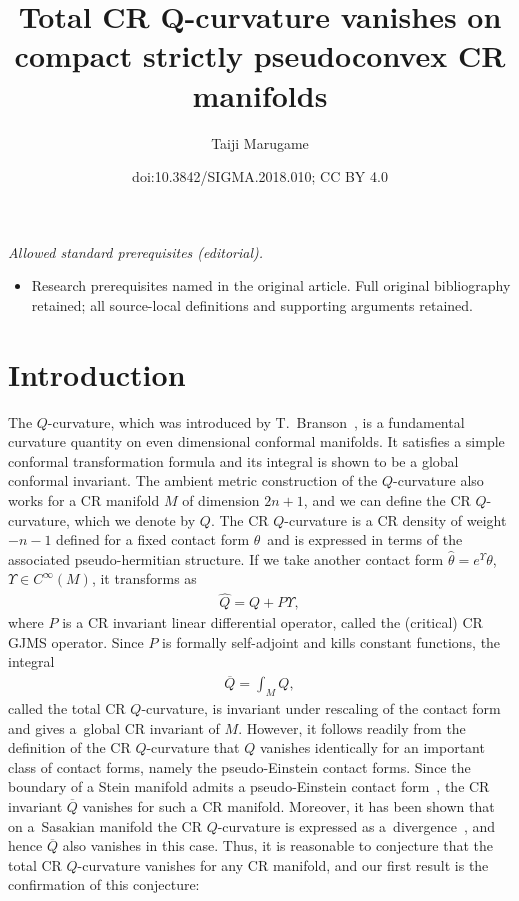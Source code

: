 \documentclass[10pt,a4paper]{amsart}
\title{Total CR Q-curvature vanishes on compact strictly pseudoconvex CR manifolds}
\author{Taiji Marugame}
\date{doi:10.3842/SIGMA.2018.010; CC BY 4.0}
\numberwithin{equation}{section}
\begin{document}
\maketitle
\noindent\textit{Allowed standard prerequisites (editorial).}\begin{itemize}
\item Research prerequisites named in the original article. Full original bibliography retained; all source-local definitions and supporting arguments retained.
\end{itemize}\medskip
\section{Introduction}
The $Q$-curvature, which was introduced by T.~Branson~\cite{Branson}, is a fundamental curvature quantity on even dimensional conformal manifolds. It satisf\/ies a simple conformal transformation formula and its integral is shown to be a global conformal invariant. The ambient metric construction of the $Q$-curvature \cite{Fefferman/Hirachi} also works for a CR manifold $M$ of dimension $2n+1$, and we can def\/ine the CR $Q$-curvature, which we denote by $Q$. The CR $Q$-curvature is a CR density of weight $-n-1$ def\/ined for a f\/ixed contact form $\theta$\, and is expressed in terms of the associated pseudo-hermitian structure. If we take another contact form $\widehat\theta=e^\Upsilon\theta$, $\Upsilon\in C^\infty(M)$, it transforms as
\begin{gather*}
\widehat Q=Q+P\Upsilon,
\end{gather*}
where $P$ is a CR invariant linear dif\/ferential operator, called the (critical) CR GJMS operator. Since $P$ is formally self-adjoint and kills constant functions, the integral
\begin{gather*}
\overline{Q}=\int_M Q,
\end{gather*}
called the total CR $Q$-curvature, is invariant under rescaling of the contact form and gives a~global CR invariant of $M$. However, it follows readily from the def\/inition of the CR $Q$-curvature that $Q$ vanishes identically for an important class of contact forms, namely the pseudo-Einstein contact forms. Since the boundary of a Stein manifold admits a pseudo-Einstein contact form~\cite{Cao/Chang}, the CR invariant $\overline{Q}$ vanishes for such a CR manifold. Moreover, it has been shown that on a~Sasakian manifold the CR $Q$-curvature is expressed as a~divergence~\cite{Alexakis/Hirachi}, and hence $\overline{Q}$ also vanishes in this case. Thus, it is reasonable to conjecture that the total CR $Q$-curvature vanishes for any CR manifold, and our f\/irst result is the conf\/irmation of this conjecture:
\end{document}
